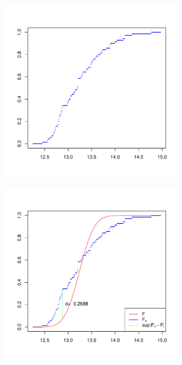 \documentclass[a4paper, 12pt, titlepage, headsepline, listof = totoc, bibliography = totoc, numbers = noenddot]{scrartcl}
\newcommand{\cdf}{c.\,d.\,f. }
\begin{document}
\begin{figure}[H]
\centering
\begin{subfigure}{.5\textwidth}
  \centering
  \includegraphics[width=\linewidth]{report-empiricFunc}
  \vspace{-1cm}
  \caption{}
  \label{fig:empiricFunc}
\end{subfigure}%
\begin{subfigure}{.5\textwidth}
  \centering
  \includegraphics[width=\linewidth]{report-empiricTeorFunc}

\end{subfigure}
\end{figure}
\end{document}
